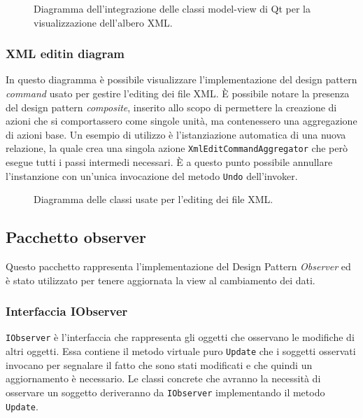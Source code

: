		\begin{figure}[!h] 
			\centering 
			\caption{Diagramma dell'integrazione delle classi model-view di Qt per la visualizzazione dell'albero XML.}
		\end{figure}
		
		\subsubsection{XML editin diagram}
		In questo diagramma è possibile visualizzare l'implementazione del design pattern \textit{command} usato per gestire l'editing dei file XML. È possibile notare la presenza del design pattern \textit{composite}, inserito allo scopo di permettere la creazione di azioni che si comportassero come singole unità, ma contenessero una aggregazione di azioni base. Un esempio di utilizzo è l'istanziazione automatica di una nuova relazione, la quale crea una singola azione \texttt{XmlEditCommandAggregator} che però esegue tutti i passi intermedi necessari. È a questo punto possibile annullare l'instanzione con un'unica invocazione del metodo \texttt{Undo} dell'invoker.
		
		\begin{figure}[!h] 
			\centering 
			\caption{Diagramma delle classi usate per l'editing dei file XML.}
		\end{figure}

\newpage

\subsection{Pacchetto observer}
Questo pacchetto rappresenta l'implementazione del Design Pattern \textit{Observer} ed è stato utilizzato per tenere aggiornata la view al cambiamento dei dati.

	\subsubsection{Interfaccia IObserver}
		\texttt{IObserver} è l'interfaccia che rappresenta gli oggetti che osservano le modifiche di altri oggetti. Essa contiene il metodo virtuale puro \texttt{Update} che i soggetti osservati invocano per segnalare il fatto che sono stati modificati e che quindi un aggiornamento è necessario. Le classi concrete che avranno la necessità di osservare un soggetto deriveranno da \texttt{IObserver} implementando il metodo \texttt{Update}.

